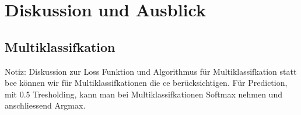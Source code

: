 \section{Diskussion und Ausblick}

\subsection{Multiklassifkation}

Notiz: Diskussion zur Loss Funktion und Algorithmus für Multiklassifkation
statt \acrlong{bce} können wir für Multiklassifkationen die \acrlong{ce} berücksichtigen. 
Für Prediction, mit 0.5 Tresholding, kann man bei Multiklassifkationen Softmax nehmen und anschliessend Argmax. 
